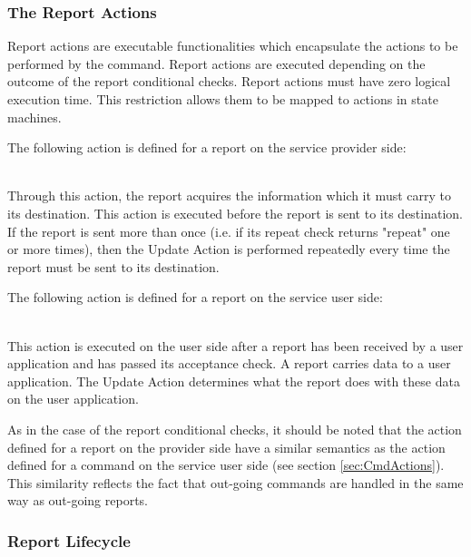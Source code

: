 \subsubsection{The Report Actions}\label{sec:RepActions}

Report actions are executable functionalities which encapsulate the actions to be performed by the command. Report actions are executed depending on the outcome of the report conditional checks. Report actions must have zero logical execution time. This restriction allows them to be mapped to actions in state machines. 

The following action is defined for a report on the service provider side:

\begin{fw_description}
\item[Update Action]\hfill\\
Through this action, the report acquires the information which it must carry to its destination. This action is executed before the report is sent to its destination. If the report is sent more than once (i.e. if its repeat check returns "repeat" one or more times), then the Update Action is performed repeatedly every time the report must be sent to its destination.
\end{fw_description} 

The following action is defined for a report on the service user side:

\begin{fw_description}
\item[Update Action]\hfill\\
This action is executed on the user side after a report has been received by a user application and has passed its acceptance check. A report carries data to a user application. The Update Action determines what the report does with these data on the user application. 
\end{fw_description} 

As in the case of the report conditional checks, it should be noted that the action defined for a report on the provider side have a similar semantics as the action defined for a command on the service user side (see section \ref{sec:CmdActions}). This similarity reflects the fact that out-going commands are handled in the same way as out-going reports.

\subsubsection{Report Lifecycle}\label{sec:RepLifecycle}


